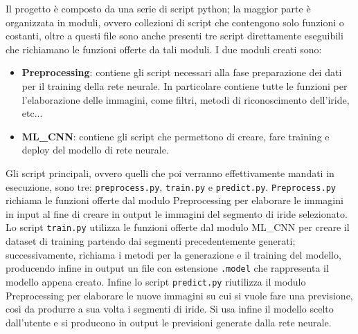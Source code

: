 Il progetto è composto da una serie di script python; la maggior parte è organizzata in moduli, ovvero collezioni di script che contengono solo funzioni o costanti, oltre a questi file sono anche presenti tre script direttamente eseguibili che richiamano le funzioni offerte da tali moduli.
I due moduli creati sono:
\begin{itemize}
  \item \textbf{Preprocessing}: contiene gli script necessari alla fase preparazione dei dati per il training della rete neurale. In particolare contiene tutte le funzioni per l’elaborazione delle immagini, come filtri, metodi di riconoscimento dell’iride, etc...
  \item \textbf{ML\_CNN}:  contiene gli script che permettono di creare, fare training e deploy del modello di rete neurale.  
\end{itemize}

Gli script principali, ovvero quelli che poi verranno effettivamente mandati in esecuzione,  sono tre: \texttt{preprocess.py}, \texttt{train.py} e \texttt{predict.py}. \texttt{Preprocess.py} richiama le funzioni offerte dal modulo Preprocessing per elaborare le immagini in input al fine di  creare in output le immagini del segmento di iride selezionato. Lo script \texttt{train.py} utilizza le funzioni offerte dal modulo ML\_CNN per creare il dataset di training partendo dai segmenti precedentemente generati; successivamente, richiama i metodi per la generazione e il training del modello, producendo infine in output un file con estensione \texttt{.model} che rappresenta il modello appena creato. Infine lo script \texttt{predict.py} riutilizza il modulo Preprocessing per elaborare le nuove immagini su cui si vuole fare una previsione, così da produrre a sua volta i segmenti di iride. Si usa infine il modello scelto dall’utente e si producono in output le previsioni generate dalla rete neurale.
